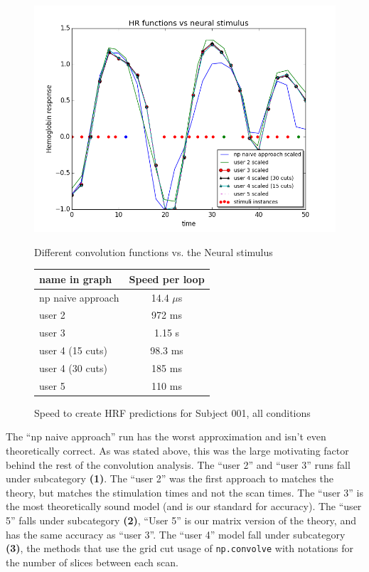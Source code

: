 \begin{figure}[ht]
\centering
	\begin{minipage}[b]{0.45\linewidth}
		\centering
		\includegraphics[width=.8\linewidth]{images/convolution_vs_neural_stimulus}  
		\caption{\scriptsize{Different convolution functions vs. the Neural stimulus}}
		\label{fig:convolution}

	\end{minipage}
\quad
	\begin{minipage}[b]{0.45\linewidth}
		\centering
		\begin{tabular}{|l | c|}
		\hline
		name in graph       & Speed per loop \\
		\hline
		np naive approach & 14.4 $\mu$s  \\
		user 2     		    & 972 ms  \\
		user 3     		    & 1.15 s    \\
		user 4 (15 cuts)      & 98.3 ms \\
		user 4 (30 cuts)      & 185 ms  \\
		user 5     	 	    & 110 ms   \\
		\hline
		\end{tabular}
		\vspace{5mm}
		\caption{\scriptsize{Speed to create HRF predictions for Subject 001, 
		all conditions}}
		\label{table:convolution}
	\end{minipage}
\end{figure}

The ``np naive approach'' run has the worst approximation and isn't even 
theoretically correct. As was stated above, this was the large motivating factor 
behind the rest of the convolution analysis. The ``user 2'' and ``user 3'' runs fall 
under subcategory \textbf{(1)}. The ``user 2'' was the first approach to
matches the theory, but matches the stimulation times and not the scan times.
The ``user 3'' is the most theoretically sound model (and is our standard for 
accuracy). The ``user 5'' falls under subcategory \textbf{(2)}, ``User 5''  is our 
matrix version of the theory, and has the same accuracy as ``user 3''. The 
``user 4'' model fall under subcategory \textbf{(3)}, the methods that use the 
grid cut usage of \texttt{np.convolve} with notations for the number of slices 
between each scan.

